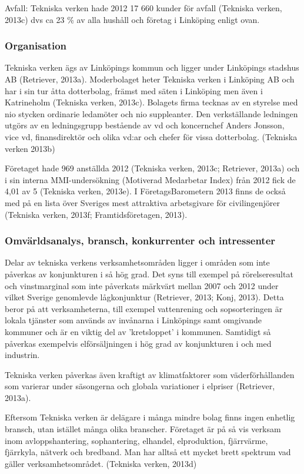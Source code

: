 \documentclass[10pt,a4paper]{article}
\begin{document}
Avfall: Tekniska verken hade 2012 17 660 kunder för avfall (Tekniska verken, 2013c) dvs ca 23 \% av alla hushåll och företag i Linköping enligt ovan. 

\subsubsection{Organisation}
Tekniska verken ägs av Linköpings kommun och ligger under Linköpings stadshus AB (Retriever, 2013a). Moderbolaget heter Tekniska verken i Linköping AB och har i sin tur åtta dotterbolag, främst med säten i Linköping men även i Katrineholm (Tekniska verken, 2013c).  Bolagets firma tecknas av en styrelse med nio stycken ordinarie ledamöter och nio suppleanter. Den verkställande ledningen utgörs av en ledningsgrupp bestående av vd och koncernchef Anders Jonsson, vice vd, finansdirektör och olika vd:ar och chefer för vissa dotterbolag. (Tekniska verken 2013b)

Företaget hade 969 anställda 2012 (Tekniska verken, 2013c; Retriever, 2013a) och i sin interna MMI-undersökning (Motiverad Medarbetar Index) från 2012 fick de 4,01 av 5 (Tekniska verken, 2013e). I FöretagsBarometern 2013 finns de också med på en lista över Sveriges mest attraktiva arbetsgivare för civilingenjörer (Tekniska verken, 2013f; Framtidsföretagen, 2013). 

\subsubsection{Omvärldsanalys, bransch, konkurrenter och intressenter}
Delar av tekniska verkens verksamhetsområden ligger i områden som inte
påverkas av konjunkturen i så hög grad. Det syns till exempel på
rörelseresultat och vinstmarginal som inte påverkats märkvärt mellan
2007 och 2012 under vilket Sverige genomlevde lågkonjunktur (Retriever, 2013; Konj, 2013). Detta beror på att verksamheterna, 
till exempel vattenrening och sopsorteringen är lokala tjänster som används av 
invånarna i Linköpings samt omgivande kommuner och är en viktig del av 'kretsloppet' i kommunen.
Samtidigt så påverkas exempelvis elförsäljningen i hög grad av konjunkturen i
och med industrin.

Tekniska verken påverkas även kraftigt av klimatfaktorer som väderförhållanden 
som varierar under säsongerna och globala variationer i elpriser (Retriever, 2013a).


Eftersom Tekniska verken är delägare i många mindre bolag finns ingen enhetlig 
bransch, utan istället många olika branscher. Företaget är på så vis verksam inom
avloppshantering, sophantering, elhandel, elproduktion, fjärrvärme, fjärrkyla, 
nätverk och bredband. Man har alltså ett mycket brett spektrum vad gäller 
verksamhetsområdet. (Tekniska verken, 2013d)
\end{document}
